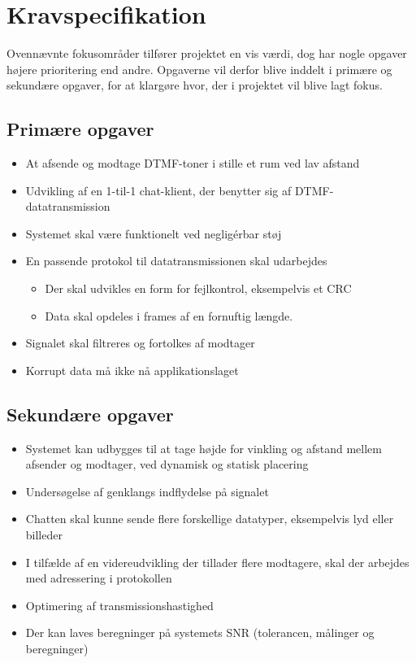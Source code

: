 \section{Kravspecifikation}

Ovennævnte fokusområder tilfører projektet en vis værdi, dog har nogle opgaver højere prioritering end andre. Opgaverne vil derfor blive inddelt i primære og sekundære opgaver, for at klargøre hvor, der i projektet vil blive lagt fokus.

\subsection{Primære opgaver}

\begin{itemize}[noitemsep]
  \item At afsende og modtage DTMF-toner i stille et rum ved lav afstand
  \item Udvikling af en 1-til-1 chat-klient, der benytter sig af DTMF-datatransmission
  \item Systemet skal være funktionelt ved negligérbar støj
  \item En passende protokol til datatransmissionen skal udarbejdes
  \begin{itemize}[noitemsep]
    \item Der skal udvikles en form for fejlkontrol, eksempelvis et CRC
    \item Data skal opdeles i frames af en fornuftig længde.
  \end{itemize}
  \item Signalet skal filtreres og fortolkes af modtager
  \item Korrupt data må ikke nå applikationslaget
\end{itemize}

\subsection{Sekundære opgaver}

\begin{itemize}[noitemsep]
\item Systemet kan udbygges til at tage højde for vinkling og afstand mellem afsender og modtager, ved dynamisk og statisk placering
\item Undersøgelse af genklangs indflydelse på signalet
\item Chatten skal kunne sende flere forskellige datatyper, eksempelvis lyd eller billeder
\item I tilfælde af en videreudvikling der tillader flere modtagere, skal der arbejdes med adressering i protokollen
\item Optimering af transmissionshastighed
\item Der kan laves beregninger på systemets SNR (tolerancen, målinger og beregninger)
\end{itemize}